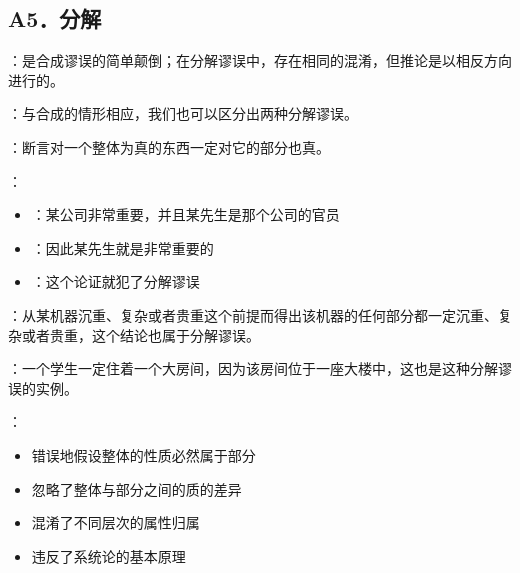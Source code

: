 \subsection{A5．分解}

\begin{theorembox}[title=分解谬误的定义]
：是合成谬误的简单颠倒；在分解谬误中，存在相同的混淆，但推论是以相反方向进行的。

：与合成的情形相应，我们也可以区分出两种分解谬误。

：断言对一个整体为真的东西一定对它的部分也真。

：
\begin{itemize}
  \item {}：某公司非常重要，并且某先生是那个公司的官员
  \item {}：因此某先生就是非常重要的
  \item {}：这个论证就犯了分解谬误
\end{itemize}

：从某机器沉重、复杂或者贵重这个前提而得出该机器的任何部分都一定沉重、复杂或者贵重，这个结论也属于分解谬误。

：一个学生一定住着一个大房间，因为该房间位于一座大楼中，这也是这种分解谬误的实例。

：
\begin{itemize}
  \item 错误地假设整体的性质必然属于部分
  \item 忽略了整体与部分之间的质的差异
  \item 混淆了不同层次的属性归属
  \item 违反了系统论的基本原理
\end{itemize}
\end{theorembox}

